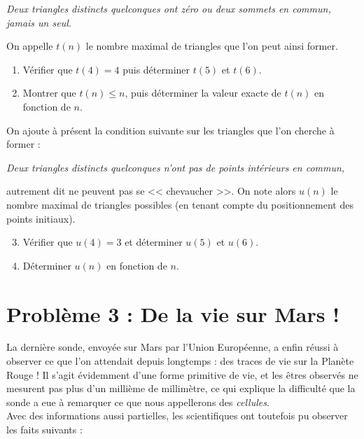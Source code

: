 \documentclass[landscape,twocolumn,leqno,a4paper,10pt]{report} %
\newcommand\n{\noindent}
\renewcommand{\leq}{\leqslant}
\begin{document}
\begin{center}
\textit{Deux triangles distincts quelconques ont zéro ou deux sommets en commun, jamais un seul.}
\end{center}

\n On appelle $t(n)$ le nombre maximal de triangles que l'on peut ainsi former.

\begin{enumerate}
	\item Vérifier que $t(4)=4$ puis déterminer $t(5)$ et $t(6)$.
	\item Montrer que $t(n) \leq n$, puis déterminer la valeur exacte de $t(n)$ en fonction de $n$.
\end{enumerate}

\n On ajoute à présent la condition suivante sur les triangles que l'on cherche à former :
\begin{center}
\textit{Deux triangles distincts quelconques n'ont pas de points intérieurs en commun,}
\end{center}
autrement dit ne peuvent pas se << chevaucher >>. On note alors $u(n)$ le nombre maximal de triangles possibles (en tenant compte du positionnement des points initiaux).
\begin{enumerate}\setcounter{enumi}{2}
	\item Vérifier que $u(4)=3$ et déterminer $u(5)$ et $u(6)$.
	\item Déterminer $u(n)$ en fonction de $n$.
\end{enumerate}
  

\section{Problème 3 : De la vie sur Mars !}

\n La dernière sonde, envoyée sur Mars par l'Union Européenne, a enfin réussi à observer ce que l'on attendait depuis longtemps : des traces de vie sur la Planète Rouge ! Il s'agit évidemment d'une forme primitive de vie, et les êtres observés ne mesurent pas plus d'un millième de millimètre, ce qui explique la difficulté que la sonde a eue à remarquer ce que nous appellerons des \textit{cellules}.\\
Avec des informations aussi partielles, les scientifiques ont toutefois pu observer les faits suivants :
\end{document}
